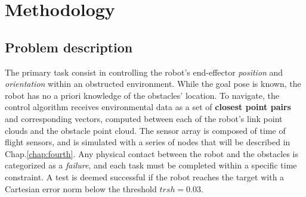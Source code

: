 
\chapter{Methodology}
\label{chap:third}
\graphicspath{{Chapter3/Figures/PNG/}{Chapter3/Figures/JPG/}{Chapter3/Figures/EPS/}{Chapter3/Figures/}}
\section{Problem description}
The primary task consist in controlling the robot's end-effector \textit{position} and \textit{orientation} within an obstructed environment. While the goal pose is known, the robot has no a priori knowledge of the obstacles' location. To navigate, the control algorithm receives environmental data as a set of \textbf{closest point pairs} and corresponding vectors, computed between each of the robot’s link point clouds and the obstacle point cloud. The sensor array is composed of time of flight sensors, and is simulated with a series of nodes that will be described in Chap.\ref{chap:fourth}. Any physical contact between the robot and the obstacles is categorized as a \textit{failure}, and each task must be completed within a specific time constraint. A test is deemed successful if the robot reaches the target with a Cartesian error norm below the threshold $trsh = 0.03$. 

